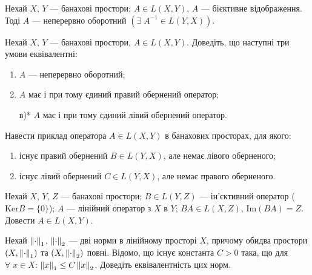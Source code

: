 
\begin{theory}
    \begin{theorem*}
        Нехай $X$, $Y$ --- банахові простори; $A \in L(X,Y)$,
        $A$ --- бієктивне відображення. Тоді $A$ --- неперервно оборотний
        $\left(\exists \; A^{-1} \in L(Y, X)\right)$.
    \end{theorem*}
\end{theory}

\begin{exercise}
    Нехай $X$, $Y$ --- банахові простори, $A \in L(X,Y)$.
    Доведіть, що наступні три умови еквівалентні:
    \begin{enumerate}
        \item $A$ --- неперервно оборотний;
        \item $A$ має і при тому єдиний правий обернений оператор;
        \item[в)*] $A$ має і при тому єдиний лівий обернений оператор.
    \end{enumerate}
\end{exercise}

\begin{exercise}
    Навести приклад оператора $A \in L(X,Y)$ в банахових просторах, для якого:
    \begin{enumerate}
        \item існує правий обернений $B\in L(Y,X)$, але немає лівого оберненого;
        \item існує лівий обернений $C\in L(Y,X)$, але немає правого оберненого.
    \end{enumerate}
\end{exercise}

\begin{exercise}\label{N:1_6_28}
    Нехай $X$, $Y$, $Z$ --- банахові простори; $B \in L(Y,Z)$ --- ін'єктивний
    оператор ($\mathrm{Ker}B = \{0\}$); $A$ --- лінійний оператор з $X$ в $Y$;
    $BA \in L(X,Z)$, $\mathrm{Im}(BA) = Z$. Довести $A \in L(X,Y)$.
\end{exercise}

\begin{exercise}
    Нехай $\left\lVert\cdot\right\rVert_1$, $\left\lVert\cdot\right\rVert_2$  --- дві норми в лінійному просторі
    $X$, причому обидва простори $(X, \left\lVert\cdot\right\rVert_1)$ та $(X, \left\lVert\cdot\right\rVert_2)$ 
    повні. Відомо, що існує константа $C > 0$ така, що для $\forall \; x \in X$:
    $\left\lVert x\right\rVert_1 \leq C \left\lVert x\right\rVert_2$. Доведіть еквівалентність цих норм.
\end{exercise}

